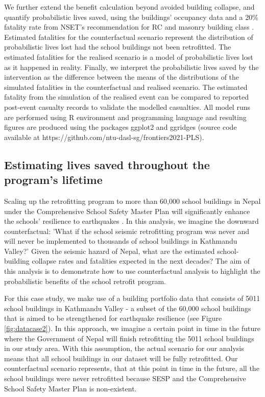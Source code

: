 \documentclass[utf8]{frontiersSCNS} %
\begin{document}
We further extend the benefit calculation beyond avoided building collapse, and quantify probabilistic lives saved, using the buildings' occupancy data and a 20\% fatality rate from NSET's recommendation for RC and masonry building class \citep{nset2000}. Estimated fatalities for the counterfactual scenario represent the distribution of probabilistic lives lost had the school buildings not been retrofitted. The estimated fatalities for the realised scenario is a model of probabilistic lives lost as it happened in reality. Finally, we interpret the probabilistic lives saved by the intervention as the difference between the means of the distributions of the simulated fatalities in the counterfactual and realised scenario. The estimated fatality from the simulation of the realised event can be compared to reported post-event casualty records to validate the modelled casualties. All model runs are performed using R environment and programming language \citep{team2013r} and resulting figures are produced using the packages ggplot2 \citep{ggplot22016} and ggridges \citep{ggridges2021} (source code available at https://github.com/ntu-dasl-sg/frontiers2021-PLS).

\subsection{Estimating lives saved throughout the program's lifetime}
\label{section-case2}

Scaling up the retrofitting program to more than 60,000 school buildings in Nepal under the Comprehensive School Safety Master Plan will significantly enhance the schools' resilience to earthquakes \citep{cehrdc2018}. In this analysis, we imagine the downward counterfactual: 'What if the school seismic retrofitting program was never and will never be implemented to thousands of school buildings in Kathmandu Valley?' Given the seismic hazard of Nepal, what are the estimated school-building collapse rates and fatalities expected in the next decades? The aim of this analysis is to demonstrate how to use counterfactual analysis to highlight the probabilistic benefits of the school retrofit program.

For this case study, we make use of a building portfolio data that consists of 5011 school buildings in Kathmandu Valley - a subset of the 60,000 school buildings that is aimed to be strengthened for earthquake resilience (see Figure \ref{fig:datacase2}). In this approach, we imagine a certain point in time in the future where the Government of Nepal will finish retrofitting the 5011 school buildings in our study area. With this assumption, the actual scenario for our analysis means that all school buildings in our dataset will be fully retrofitted. Our counterfactual scenario represents, that at this point in time in the future, all the school buildings were never retrofitted because SESP and the Comprehensive School Safety Master Plan is non-existent.
\end{document}
